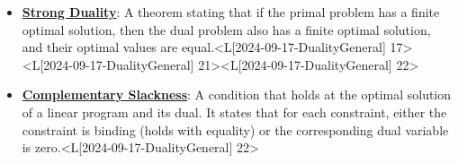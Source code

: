 \documentclass{article}%
\begin{document}
\begin{itemize}[[leftmargin=*]]
\item \href{https://www.math.purdue.edu/~yipn/421/2024-09-17-DualityGeneral.pdf#page=17}{\textbf{Strong Duality}}: A theorem stating that if the primal problem has a finite optimal solution, then the dual problem also has a finite optimal solution, and their optimal values are equal.<L[2024-09-17-DualityGeneral] 17><L[2024-09-17-DualityGeneral] 21><L[2024-09-17-DualityGeneral] 22>%
\item \href{https://www.math.purdue.edu/~yipn/421/2024-09-17-DualityGeneral.pdf#page=22}{\textbf{Complementary Slackness}}: A condition that holds at the optimal solution of a linear program and its dual. It states that for each constraint, either the constraint is binding (holds with equality) or the corresponding dual variable is zero.<L[2024-09-17-DualityGeneral] 22>%
\end{itemize}%
\end{document}
